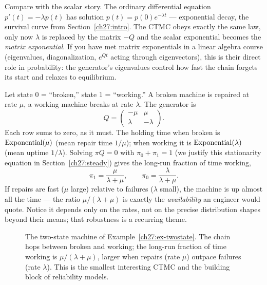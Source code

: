 \begin{connectionbox}
Compare with the scalar story. The ordinary differential equation $p'(t) = -\lambda p(t)$ has
solution $p(t) = p(0)e^{-\lambda t}$ --- exponential decay, the survival curve from
Section~\ref{ch27:intro}. The CTMC obeys exactly the same law, only now $\lambda$ is replaced by the
matrix $-Q$ and the scalar exponential becomes the \emph{matrix exponential}. If you have met
matrix exponentials in a linear algebra course (eigenvalues, diagonalization, $e^{Qt}$ acting
through eigenvectors), this is their direct role in probability: the generator's
eigenvalues control how fast the chain forgets its start and relaxes to equilibrium.
\end{connectionbox}

\begin{example}
\label{ch27:ex-twostate}
Let state $0$ = ``broken,'' state $1$ = ``working.'' A broken machine is repaired at rate $\mu$, a
working machine breaks at rate $\lambda$. The generator is
\[
  Q = \begin{pmatrix} -\mu & \mu \\ \lambda & -\lambda \end{pmatrix}.
\]
Each row sums to zero, as it must. The holding time when broken is $\operatorname{Exponential}(\mu)$ (mean repair time
$1/\mu$); when working it is $\operatorname{Exponential}(\lambda)$ (mean uptime $1/\lambda$). Solving $\pi Q = 0$ with
$\pi_0 + \pi_1 = 1$ (we justify this stationarity equation in Section~\ref{ch27:steady}) gives the
long-run fraction of time working,
\[
  \pi_1 = \frac{\mu}{\lambda + \mu},
  \qquad \pi_0 = \frac{\lambda}{\lambda + \mu}.
\]
If repairs are fast ($\mu$ large) relative to failures ($\lambda$ small), the machine is up almost
all the time --- the ratio $\mu/(\lambda+\mu)$ is exactly the \emph{availability} an engineer would
quote. Notice it depends only on the rates, not on the precise distribution shapes beyond their
means; that robustness is a recurring theme.
\end{example}

\begin{figure}[H]
\centering
{}
\caption{The two-state machine of Example~\ref{ch27:ex-twostate}. The chain hops between broken and
working; the long-run fraction of time working is $\mu/(\lambda+\mu)$, larger when repairs (rate
$\mu$) outpace failures (rate $\lambda$). This is the smallest interesting CTMC and the building block
of reliability models.}
\label{ch27:fig-twostate}
\end{figure}

